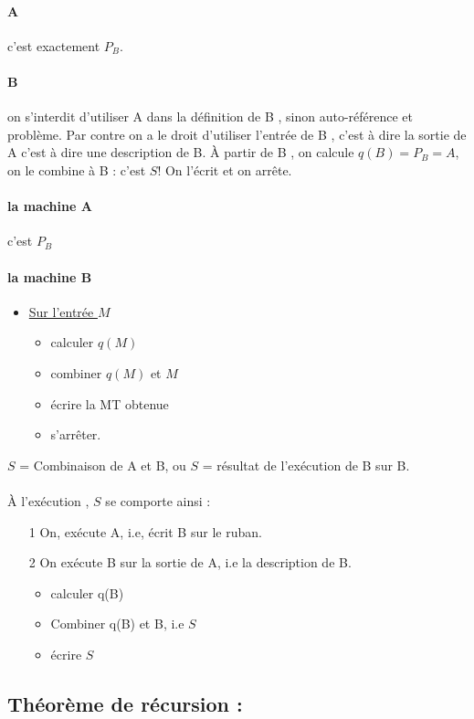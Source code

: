\documentclass{article}
\begin{document}
{{\paragraph{A} c’est exactement $P_B$.
\paragraph{B} on s'interdit d'utiliser A dans la définition de B , sinon auto-référence et problème. Par contre on a le droit d'utiliser l'entrée de B , c’est à dire la sortie de A c'est à dire une description de B. À partir de B , on calcule $q(B) = P_B  =A$, on le combine à B : c'est $S$! On l'écrit et on arrête.
\paragraph{ la machine A} c'est $P_B$
\paragraph{la machine B} \begin{itemize}
\item \underline{Sur l'entrée $M$}
\begin{itemize}
\item calculer $q(M)$
\item combiner $q(M)$ et $M$
\item écrire la MT obtenue
\item s’arrêter.
\end{itemize}
\end{itemize}
$S$ = Combinaison de A et B, ou $S$ = résultat de l'exécution de B sur B.
\paragraph{} À l'exécution , $S$ se comporte ainsi :
\begin{itemize}
\item[1] On, exécute A, i.e, écrit B sur le ruban.
\item[2] On exécute B sur la sortie de A, i.e la description de B.
\begin{itemize}
\item calculer q(B)
\item Combiner q(B) et B, i.e $S$
\item écrire $S$
\end{itemize}
\end{itemize}
\newpage
\subsection{Théorème de récursion : } 
}}
\end{document}

